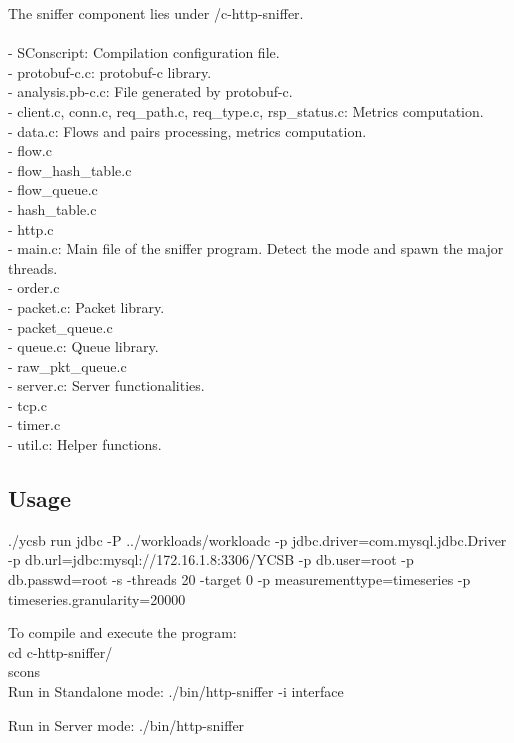 \documentclass[12pt,hidelinks]{article}
\begin{document}
\vspace*{0.75\baselineskip}

The sniffer component lies under /c-http-sniffer. \\
\\
- SConscript: Compilation configuration file. \\
- protobuf-c.c: protobuf-c library. \\
- analysis.pb-c.c: File generated by protobuf-c. \\
- client.c, conn.c, req\_path.c, req\_type.c, rsp\_status.c: Metrics computation. \\
- data.c: Flows and pairs processing, metrics computation.\\
- flow.c \\
- flow\_hash\_table.c \\
- flow\_queue.c \\
- hash\_table.c \\
- http.c \\
- main.c: Main file of the sniffer program. Detect the mode and spawn the major threads. \\
- order.c \\
- packet.c: Packet library. \\
- packet\_queue.c \\
- queue.c: Queue library. \\
- raw\_pkt\_queue.c \\
- server.c: Server functionalities. \\
- tcp.c \\
- timer.c \\
- util.c: Helper functions.

\subsection{Usage}
./ycsb run jdbc
-P ../workloads/workloadc
-p jdbc.driver=com.mysql.jdbc.Driver
-p db.url=jdbc:mysql://172.16.1.8:3306/YCSB
-p db.user=root
-p db.passwd=root
-s
-threads 20
-target 0
-p measurementtype=timeseries
-p timeseries.granularity=20000

To compile and execute the program: \\
cd c-http-sniffer/ \\
scons \\

Run in Standalone mode:
./bin/http-sniffer -i interface

Run in Server mode:
./bin/http-sniffer
\end{document}
